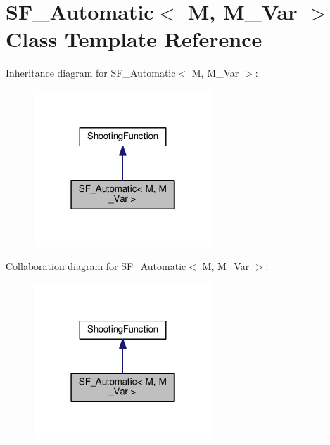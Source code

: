 \hypertarget{classSF__Automatic}{}\section{S\+F\+\_\+\+Automatic$<$ M, M\+\_\+\+Var $>$ Class Template Reference}
\label{classSF__Automatic}


Inheritance diagram for S\+F\+\_\+\+Automatic$<$ M, M\+\_\+\+Var $>$\+:\nopagebreak
\begin{figure}[H]
\begin{center}
\leavevmode
\includegraphics[width=190pt]{classSF__Automatic__inherit__graph}
\end{center}
\end{figure}


Collaboration diagram for S\+F\+\_\+\+Automatic$<$ M, M\+\_\+\+Var $>$\+:\nopagebreak
\begin{figure}[H]
\begin{center}
\leavevmode
\includegraphics[width=190pt]{classSF__Automatic__coll__graph}
\end{center}
\end{figure}
